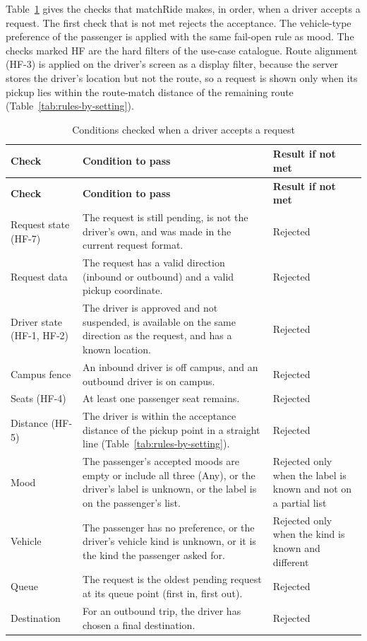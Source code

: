 Table~\ref{tab:ai-accept} gives the checks that matchRide makes, in order, when a driver accepts a request. The first check that is not met rejects the acceptance. The vehicle-type preference of the passenger is applied with the same fail-open rule as mood. The checks marked HF are the hard filters of the use-case catalogue. Route alignment (HF-3) is applied on the driver's screen as a display filter, because the server stores the driver's location but not the route, so a request is shown only when its pickup lies within the route-match distance of the remaining route (Table~\ref{tab:rules-by-setting}).

{
\small
\setlength{\tabcolsep}{4pt}
\renewcommand{\arraystretch}{1.2}
\begin{longtable}{|>{\raggedright\arraybackslash}p{}|>{\raggedright\arraybackslash}p{}|>{\raggedright\arraybackslash}p{}|}
\caption{Conditions checked when a driver accepts a request}\label{tab:ai-accept}\\
\hline
\textbf{Check} & \textbf{Condition to pass} & \textbf{Result if not met} \\
\hline
\endfirsthead
\hline
\textbf{Check} & \textbf{Condition to pass} & \textbf{Result if not met} \\
\hline
\endhead
\endfoot
Request state (HF-7) & The request is still pending, is not the driver's own, and was made in the current request format. & Rejected \\
\hline
Request data & The request has a valid direction (inbound or outbound) and a valid pickup coordinate. & Rejected \\
\hline
Driver state (HF-1, HF-2) & The driver is approved and not suspended, is available on the same direction as the request, and has a known location. & Rejected \\
\hline
Campus fence & An inbound driver is off campus, and an outbound driver is on campus. & Rejected \\
\hline
Seats (HF-4) & At least one passenger seat remains. & Rejected \\
\hline
Distance (HF-5) & The driver is within the acceptance distance of the pickup point in a straight line (Table~\ref{tab:rules-by-setting}). & Rejected \\
\hline
Mood & The passenger's accepted moods are empty or include all three (Any), or the driver's label is unknown, or the label is on the passenger's list. & Rejected only when the label is known and not on a partial list \\
\hline
Vehicle & The passenger has no preference, or the driver's vehicle kind is unknown, or it is the kind the passenger asked for. & Rejected only when the kind is known and different \\
\hline
Queue & The request is the oldest pending request at its queue point (first in, first out). & Rejected \\
\hline
Destination & For an outbound trip, the driver has chosen a final destination. & Rejected \\
\hline
\end{longtable}
}

